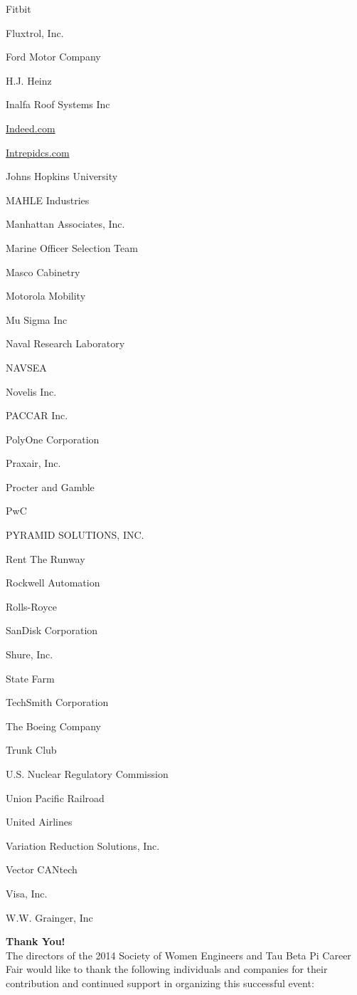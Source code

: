 \documentclass[twoside]{article}
\begin{document}
\begin{center}
\begin{multicols}{5}
\begin{FlushLeft}
\begin{compactitem}
\item Fitbit
\item Fluxtrol, Inc.
\item Ford Motor Company
\item H.J. Heinz
\item Inalfa Roof Systems Inc
\item \url{Indeed.com}
\item \url{Intrepidcs.com}
\item Johns Hopkins University
\item MAHLE Industries
\item Manhattan Associates, Inc.
\item Marine Officer Selection Team
\item Masco Cabinetry
\item Motorola Mobility
\item Mu Sigma Inc
\item Naval Research Laboratory
\item NAVSEA
\item Novelis Inc.
\item PACCAR Inc.
\item PolyOne Corporation
\item Praxair, Inc.
\item Procter and Gamble
\item PwC
\item PYRAMID SOLUTIONS, INC.
\item Rent The Runway
\item Rockwell Automation
\item Rolls-Royce
\item SanDisk Corporation
\item Shure, Inc.
\item State Farm
\item TechSmith Corporation
\item The Boeing Company
\item Trunk Club
\item U.S. Nuclear Regulatory Commission
\item Union Pacific Railroad
\item United Airlines
\item Variation Reduction Solutions, Inc.
\item Vector CANtech
\item Visa, Inc.
\item W.W. Grainger, Inc
\end{compactitem}
        \end{FlushLeft}
        \vspace{1em}
        \end{multicols}\end{center}
    \startforewardsection
    { \fontsize{16}{19}\selectfont \bf Thank You!}\\The directors of the 2014 Society of Women Engineers 
    and Tau Beta Pi Career Fair would like to thank the following individuals and 
    companies for their contribution and continued support in organizing this 
    successful event:\\
    
\end{document}
